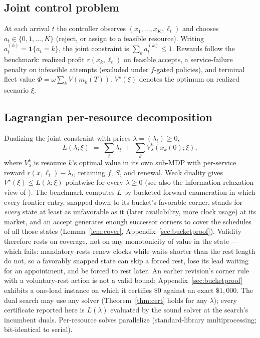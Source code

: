 \documentclass[11pt]{article}
\newcommand{\Vstar}{V^{\star}}
\begin{document}
\subsection{Joint control problem}

At each arrival $t$ the controller observes $(x_1, \dots, x_K, \ell_t)$
and chooses $a_t \in \{0, 1, \dots, K\}$ (reject, or assign to a
feasible resource). Writing $a^{(k)}_t = \mathbf{1}\{a_t = k\}$, the
joint constraint is $\sum_k a^{(k)}_t \leq 1$. Rewards follow the
benchmark: realized profit $r(x_k, \ell_t)$ on feasible accepts, a
service-failure penalty on infeasible attempts (excluded under
$f$-gated policies), and terminal fleet value
$\Phi = \omega \sum_k V(m_k(T))$. $\Vstar(\xi)$ denotes the optimum on
realized scenario $\xi$.

\subsection{Lagrangian per-resource decomposition}
\label{sec:lagrangian}

Dualizing the joint constraint with prices
$\lambda = (\lambda_t) \geq 0$,
\begin{equation}
  L(\lambda; \xi) \;=\; \sum_t \lambda_t
  \;+\; \sum_k V^k_{\lambda}(x_k(0); \xi),
  \label{eq:lag}
\end{equation}
where $V^k_{\lambda}$ is resource $k$'s optimal value in its own sub-MDP
with per-service reward $r(x, \ell_t) - \lambda_t$, retaining $f$, $S$,
and renewal. Weak duality gives $\Vstar(\xi) \leq L(\lambda; \xi)$
pointwise for every $\lambda \geq 0$ (see also the
information-relaxation view of \citealp{brown2010information}). The benchmark computes $L$ by
bucketed forward enumeration in which every frontier entry, snapped
down to its bucket's favorable corner, stands for \emph{every} state
at least as unfavorable as it (later availability, more clock usage)
at its market, and an accept generates enough successor corners to
cover the schedules of all those states
(Lemma~\ref{lem:cover}, Appendix~\ref{sec:bucketproof}). Validity
therefore rests on coverage, not on any monotonicity of value in the
state --- which fails: mandatory rests renew clocks while waits
shorter than the rest length do not, so a favorably snapped state can
skip a forced rest, lose its lead waiting for an appointment, and be
forced to rest later. An earlier revision's corner rule with a
voluntary-rest action is not a valid bound; Appendix~\ref{sec:bucketproof}
exhibits a one-load instance on which it certifies $\$0$ against an
exact $\$1{,}000$. The dual search may use any solver
(Theorem~\ref{thm:cert} holds for any $\lambda$); every certificate
reported here is $L(\lambda)$ evaluated by the sound solver at the
search's incumbent duals. Per-resource solves
parallelize (standard-library multiprocessing; bit-identical to serial).
\end{document}
